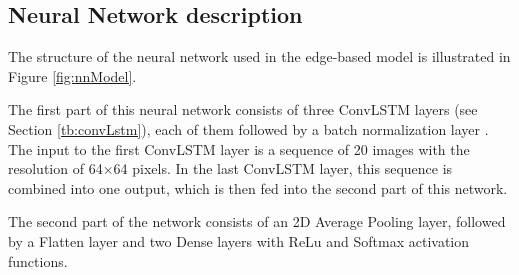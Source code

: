 \subsection{Neural Network description}
The structure of the neural network used in the edge-based model is illustrated in Figure \ref{fig:nnModel}. 

The first part of this neural network consists of three ConvLSTM layers (see Section \ref{tb:convLstm}), each of them followed by a batch normalization layer \cite{batch_normalization}. The input to the first ConvLSTM layer is a sequence of 20 images with the resolution of 64$\times$64 pixels. In the last ConvLSTM layer, this sequence is combined into one output, which is then fed into the second part of this network. 

The second part of the network consists of an 2D Average Pooling layer, followed by a Flatten layer and two Dense layers with ReLu and Softmax activation functions.

